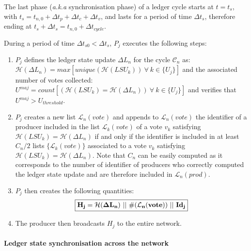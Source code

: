 The last phase (\textit{a.k.a} synchronisation phase) of a ledger cycle starts at $t = t_s$, with $t_s = t_{n,0} + \Delta t_{p} + \Delta t_{c}+ \Delta t_{v}$, and lasts for a period of time $\Delta t_{s}$, therefore ending at $t_s+\Delta t_s = t_{n,0}  + \Delta t_{cycle}$.

During a period of time $\Delta t_{s0} < \Delta t_{s}$, $P_j$ executes the following steps:

\begin{enumerate}
\item $P_j$ defines the ledger state update $\Delta L_n$ for the cycle $\mathcal{C}_n$ as:\\
 $\mathcal{H}(\Delta L_n)  = max[unique(\mathcal{H}(LSU_k))~\forall~k\in\{U_j\}]$ and the associated number of votes collected: $U^{maj} = count[(\mathcal{H}(LSU_k) = \mathcal{H}(\Delta L_n))~\forall~k\in\{U_j\}]$ and verifies that $U^{maj}> U_{threshold}$.
\item $P_j$ creates a new list $\mathcal{L}_{n}(vote)$ and appends to $\mathcal{L}_{n}(vote)$ the identifier of a producer included in the list $\mathcal{L}_{k}(vote)$ of a vote $v_k$ satisfying $\mathcal{H}(LSU_k) = \mathcal{H}(\Delta L_n)$ if and only if the identifier is included in at least $C_n/2$ lists $\{\mathcal{L}_{k}(vote)\}$ associated to a vote $v_{k}$ satisfying $\mathcal{H}(LSU_k) = \mathcal{H}(\Delta L_n)$. Note that $C_n$ can be easily computed as it corresponds to the number of identifier of producers who correctly computed the ledger state update and are therefore included in $\mathcal{L}_{n}(prod)$.
\item $P_j$ then creates the following quantities:
\begin{equation}
\label{eq:Hj}
\fbox{$\mathbf{H_{j} = \mathcal{H}(\Delta L_n)~||~\#(\mathcal{L}_{n}(vote))~||~Id_j}$}
\end{equation}
\item The producer then broadcasts $H_j$ to the entire network. %
\end{enumerate}


\paragraph{Ledger state synchronisation across the network}\mbox{}\\

